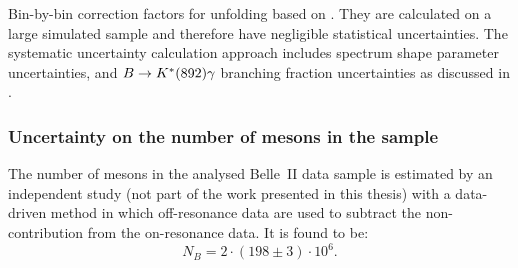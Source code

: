 \begin{table}[htbp!]
    \centering
    \caption{\label{tab:unfolding_uncertainties} Bin-by-bin correction factors for unfolding based on . 
    They are calculated on a large simulated sample and therefore have negligible statistical uncertainties.
    The systematic uncertainty calculation approach includes \EB spectrum shape parameter uncertainties, 
    \BtoXsgamma and $B\rightarrow K^*(892)\gamma$ branching fraction uncertainties as discussed in  .
    }
    
\end{table}

\subsubsection{Uncertainty on the number of \texorpdfstring{\B}{B} mesons in the sample}\label{sec:b_meson_uncertainty}

The number of \B mesons in the analysed Belle~II data sample is estimated by an independent study (not part of the work presented in this thesis)
with a data-driven method in which off-resonance data are used to subtract the non-\BB contribution from the on-resonance data.
It is found to be:
\begin{equation}\label{eq:b_meson_count}
    N_B = 2\cdot(198\pm3)\cdot10^6.
\end{equation}
